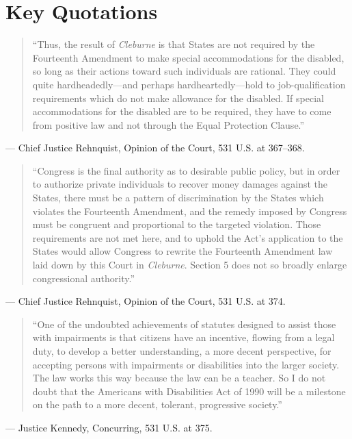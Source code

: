 \documentclass[12pt]{article}
\begin{document}
\section{Key Quotations}

\begin{quote}
``Thus, the result of \textit{Cleburne} is that States are not required by the Fourteenth Amendment to make special accommodations for the disabled, so long as their actions toward such individuals are rational. They could quite hardheadedly---and perhaps hardheartedly---hold to job-qualification requirements which do not make allowance for the disabled. If special accommodations for the disabled are to be required, they have to come from positive law and not through the Equal Protection Clause.''
\end{quote}
\noindent --- Chief Justice Rehnquist, Opinion of the Court, 531 U.S. at 367--368.

\begin{quote}
``Congress is the final authority as to desirable public policy, but in order to authorize private individuals to recover money damages against the States, there must be a pattern of discrimination by the States which violates the Fourteenth Amendment, and the remedy imposed by Congress must be congruent and proportional to the targeted violation. Those requirements are not met here, and to uphold the Act's application to the States would allow Congress to rewrite the Fourteenth Amendment law laid down by this Court in \textit{Cleburne}. Section 5 does not so broadly enlarge congressional authority.''
\end{quote}
\noindent --- Chief Justice Rehnquist, Opinion of the Court, 531 U.S. at 374.

\begin{quote}
``One of the undoubted achievements of statutes designed to assist those with impairments is that citizens have an incentive, flowing from a legal duty, to develop a better understanding, a more decent perspective, for accepting persons with impairments or disabilities into the larger society. The law works this way because the law can be a teacher. So I do not doubt that the Americans with Disabilities Act of 1990 will be a milestone on the path to a more decent, tolerant, progressive society.''
\end{quote}
\noindent --- Justice Kennedy, Concurring, 531 U.S. at 375.
\end{document}

